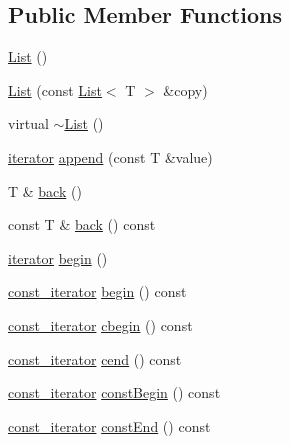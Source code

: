 \subsection*{Public Member Functions}
\begin{DoxyCompactItemize}
\item 
\hyperlink{classprism_1_1containers_1_1_list_abeda74a299867392e923e6a1087cc934}{List} ()
\item 
\hyperlink{classprism_1_1containers_1_1_list_a2575a3aa60068e7384d33874a203193c}{List} (const \hyperlink{classprism_1_1containers_1_1_list}{List}$<$ T $>$ \&copy)
\item 
virtual \hyperlink{classprism_1_1containers_1_1_list_ade258bf5c3a96946012a3e938aa0183a}{$\sim$\+List} ()
\item 
\hyperlink{classprism_1_1containers_1_1_list_af3a4f72e9b96d080fe64d1803c91c7f8}{iterator} \hyperlink{classprism_1_1containers_1_1_list_a73b3bbd57d3fc71ecc43a8ac20de6463}{append} (const T \&value)
\item 
T \& \hyperlink{classprism_1_1containers_1_1_list_ab2bb2c8183ac1c8b4a9d653957de1a0d}{back} ()
\item 
const T \& \hyperlink{classprism_1_1containers_1_1_list_af983e655ba4548f204392fe5b9818c8b}{back} () const 
\item 
\hyperlink{classprism_1_1containers_1_1_list_af3a4f72e9b96d080fe64d1803c91c7f8}{iterator} \hyperlink{classprism_1_1containers_1_1_list_a37b0107fcd6077f89ff5fb00c31c27a7}{begin} ()
\item 
\hyperlink{classprism_1_1containers_1_1_list_ab7a3833614e0dbdcc666829f86efa5e2}{const\+\_\+iterator} \hyperlink{classprism_1_1containers_1_1_list_a5389c68ee05bd5901e48a9d229186c0d}{begin} () const 
\item 
\hyperlink{classprism_1_1containers_1_1_list_ab7a3833614e0dbdcc666829f86efa5e2}{const\+\_\+iterator} \hyperlink{classprism_1_1containers_1_1_list_a87b971bb8aa556097a9b255537245050}{cbegin} () const 
\item 
\hyperlink{classprism_1_1containers_1_1_list_ab7a3833614e0dbdcc666829f86efa5e2}{const\+\_\+iterator} \hyperlink{classprism_1_1containers_1_1_list_a1421915d043f5ca5fadf9ed8d03757f8}{cend} () const 
\item 
\hyperlink{classprism_1_1containers_1_1_list_ab7a3833614e0dbdcc666829f86efa5e2}{const\+\_\+iterator} \hyperlink{classprism_1_1containers_1_1_list_ad56d4aaece9204fcf7ac0bd886068ef8}{const\+Begin} () const 
\item 
\hyperlink{classprism_1_1containers_1_1_list_ab7a3833614e0dbdcc666829f86efa5e2}{const\+\_\+iterator} \hyperlink{classprism_1_1containers_1_1_list_a97a911f414b0a882119f376fd32a41fc}{const\+End} () const 

\end{DoxyCompactItemize}
